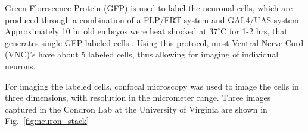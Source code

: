 Green Florescence Protein (GFP) is used to label the neuronal cells, which are produced through a combination of a FLP/FRT system and GAL4/UAS system. Approximately 10 hr old embryos were heat shocked at $37^\circ$C for 1-2 hrs, that generates single GFP-labeled cells \cite{barry_serotonergic}. Using this protocol, most Ventral Nerve Cord (VNC)'s have about 5 labeled cells, thus allowing for imaging of individual neurons.

For imaging the labeled cells, confocal microscopy was used to image the cells in three dimensions, with resolution in the micrometer range. Three images captured in the Condron Lab at the University of Virginia are shown in Fig.~\ref{fig:neuron_stack}





%
%

